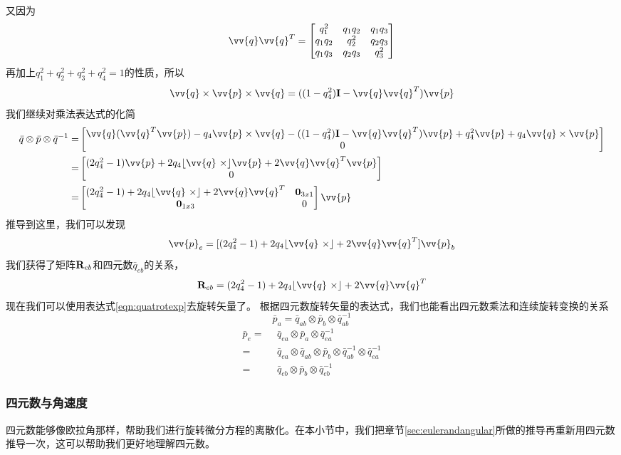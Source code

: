 \documentclass[11pt]{article}
\begin{document}
又因为
$$
\vv{q}\vv{q}^T = 
\begin{bmatrix}
q_1^2	&	q_1q_2		&	q_1q_3	\\
q_1q_2		&	q_2^2	&	q_2q_3	\\
q_1q_3		&	q_2q_3	&	q_3^2
\end{bmatrix}
$$
再加上$q_1^2+q_2^2+q_3^2+q_4^2 = 1$的性质，所以
$$
\vv{q}\times\vv{p}\times\vv{q} = ((1-q_4^2){\bf I} - \vv{q}\vv{q}^T)\vv{p}
$$
我们继续对乘法表达式的化简
\begin{align*}
\bar{q} \otimes \bar{p} \otimes \bar{q}^{-1} 
= & 
\begin{bmatrix}
\vv{q}(\vv{q}^T\vv{p}) - q_4\vv{p}\times\vv{q} - ((1-q_4^2){\bf I} - \vv{q}\vv{q}^T)\vv{p} + q_4^2\vv{p}+q_4\vv{q}\times\vv{p} \\
0  
\end{bmatrix} 
\\
= &
\begin{bmatrix}
(2q_4^2-1)\vv{p} + 2q_4\lfloor \vv{q} \ \times \rfloor \vv{p}  + 2\vv{q}\vv{q}^T\vv{p} \\
0  
\end{bmatrix} 
\\
= &
\begin{bmatrix}
(2q_4^2-1) + 2q_4\lfloor \vv{q} \ \times \rfloor   + 2\vv{q}\vv{q}^T & {\bf 0}_{3x1}\\
{\bf 0}_{1x3}  & 0
\end{bmatrix}\vv{p}
\end{align*}
推导到这里，我们可以发现
$$
\vv{p}_e = [(2q_4^2-1) + 2q_4\lfloor \vv{q} \ \times \rfloor   + 2\vv{q}\vv{q}^T]\vv{p}_b
$$
我们获得了矩阵${\bf R}_{eb}$和四元数$\bar{q}_{eb}$的关系，
$$
{\bf R}_{eb} = (2q_4^2-1) + 2q_4\lfloor \vv{q} \ \times \rfloor   + 2\vv{q}\vv{q}^T
$$
现在我们可以使用表达式\ref{eqn:quatrotexp}去旋转矢量了。
根据四元数旋转矢量的表达式，我们也能看出四元数乘法和连续旋转变换的关系
$$
\bar{p}_a = \bar{q}_{ab} \otimes \bar{p}_b \otimes \bar{q}^{-1}_{ab}
$$
\begin{align*}
\bar{p}_e = & \ \ \bar{q}_{ea} \otimes \bar{p}_a \otimes \bar{q}^{-1}_{ea}\\
		  = & \ \ \bar{q}_{ea} \otimes \bar{q}_{ab} \otimes \bar{p}_b \otimes \bar{q}^{-1}_{ab} \otimes \bar{q}^{-1}_{ea}\\
		  = & \ \ \bar{q}_{eb} \otimes \bar{p}_b \otimes \bar{q}^{-1}_{eb}
\end{align*}
\subsubsection{四元数与角速度}
四元数能够像欧拉角那样，帮助我们进行旋转微分方程的离散化。在本小节中，我们把章节\ref{sec:eulerandangular}所做的推导再重新用四元数推导一次，这可以帮助我们更好地理解四元数。
\end{document}
